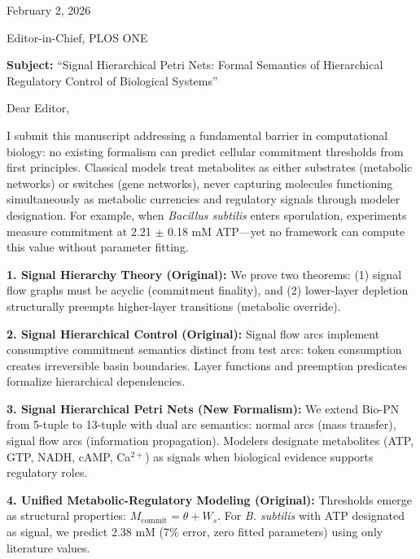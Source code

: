 \documentclass[11pt,letterpaper]{article}
\begin{document}
\pagestyle{empty}

\noindent
February 2, 2026

\vspace{6pt}

\noindent
Editor-in-Chief, PLOS ONE

\vspace{6pt}

\noindent
\textbf{Subject:} ``Signal Hierarchical Petri Nets: Formal Semantics of Hierarchical Regulatory Control of Biological Systems''

\vspace{6pt}

Dear Editor,

I submit this manuscript addressing a fundamental barrier in computational biology: no existing formalism can predict cellular commitment thresholds from first principles. Classical models treat metabolites as either substrates (metabolic networks) or switches (gene networks), never capturing molecules functioning simultaneously as metabolic currencies and regulatory signals through modeler designation. For example, when \textit{Bacillus subtilis} enters sporulation, experiments measure commitment at 2.21 $\pm$ 0.18 mM ATP---yet no framework can compute this value without parameter fitting.

\textbf{1. Signal Hierarchy Theory (Original):} We prove two theorems: (1) signal flow graphs must be acyclic (commitment finality), and (2) lower-layer depletion structurally preempts higher-layer transitions (metabolic override).

\textbf{2. Signal Hierarchical Control (Original):} Signal flow arcs implement consumptive commitment semantics distinct from test arcs: token consumption creates irreversible basin boundaries. Layer functions and preemption predicates formalize hierarchical dependencies.

\textbf{3. Signal Hierarchical Petri Nets (New Formalism):} We extend Bio-PN from 5-tuple to 13-tuple with dual arc semantics: normal arcs (mass transfer), signal flow arcs (information propagation). Modelers designate metabolites (ATP, GTP, NADH, cAMP, Ca$^{2+}$) as signals when biological evidence supports regulatory roles.

\textbf{4. Unified Metabolic-Regulatory Modeling (Original):} Thresholds emerge as structural properties: $M_{\text{commit}} = \theta + W_s$. For \textit{B. subtilis} with ATP designated as signal, we predict 2.38 mM (7\% error, zero fitted parameters) using only literature values.
\end{document}
